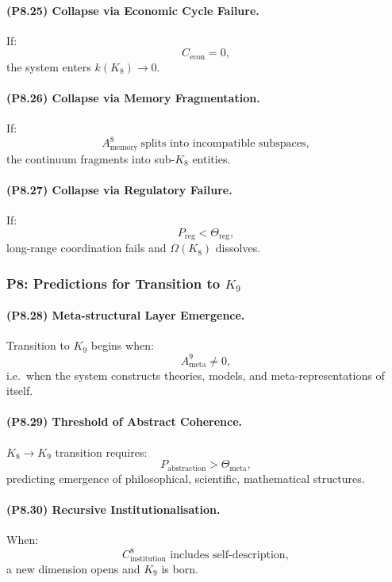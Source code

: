 \paragraph{(P8.25) Collapse via Economic Cycle Failure.}
If:
\[
C_{\mathrm{econ}} = 0,
\]
the system enters $k(K_8) \to 0$.

\paragraph{(P8.26) Collapse via Memory Fragmentation.}
If:
\[
A_{\mathrm{memory}}^8 \ \text{splits into incompatible subspaces},
\]
the continuum fragments into sub-$K_8$ entities.

\paragraph{(P8.27) Collapse via Regulatory Failure.}
If:
\[
P_{\mathrm{reg}} < \Theta_{\mathrm{reg}},
\]
long-range coordination fails and $\Omega(K_8)$ dissolves.

\subsubsection{P8: Predictions for Transition to \texorpdfstring{$K_9$}{K_9}}

\paragraph{(P8.28) Meta-structural Layer Emergence.}
Transition to $K_9$ begins when:
\[
A_{\mathrm{meta}}^9 \neq 0,
\]
i.e.\ when the system constructs theories, models, and meta-representations of itself.

\paragraph{(P8.29) Threshold of Abstract Coherence.}
$K_8 \to K_9$ transition requires:
\[
P_{\mathrm{abstraction}} > \Theta_{\mathrm{meta}},
\]
predicting emergence of philosophical, scientific, mathematical structures.

\paragraph{(P8.30) Recursive Institutionalisation.}
When:
\[
C_{\mathrm{institution}}^8 
\text{ includes self-description},
\]
a new dimension opens and $K_9$ is born.


